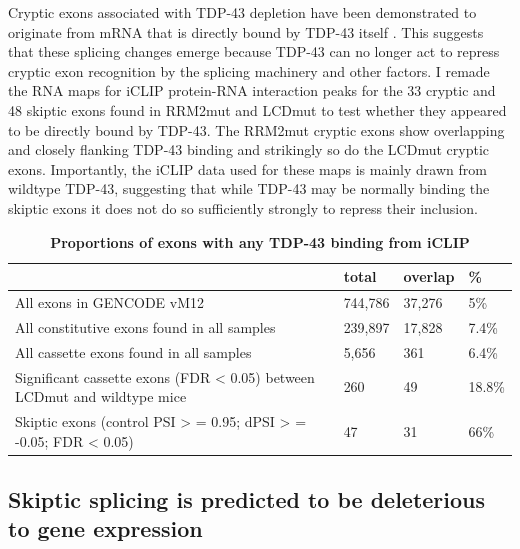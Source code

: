 Cryptic exons associated with TDP-43 depletion have been demonstrated to originate from mRNA that is directly bound by TDP-43 itself \citep{Ling2015}. 
This suggests that these splicing changes emerge because TDP-43 can no longer act to repress cryptic exon recognition by the splicing machinery and other factors. 
I remade the RNA maps for iCLIP protein-RNA interaction peaks for the 33 cryptic and 48 skiptic exons found in RRM2mut and LCDmut to test whether they appeared to be directly bound by TDP-43. 
The RRM2mut cryptic exons show overlapping and closely flanking TDP-43 binding and strikingly so do the LCDmut cryptic exons. 
Importantly, the iCLIP data used for these maps is mainly drawn from wildtype TDP-43, suggesting that while TDP-43 may be normally binding the skiptic exons it does not do so sufficiently strongly to repress their inclusion. 

\begin{table}
	\begin{footnotesize}
	\begin{tabular}{llll}
		& total &	overlap	& \% \\
		\hline
		All exons in GENCODE vM12 &	744,786	& 37,276 & 5\% \\
		All constitutive exons found in all samples	& 239,897	& 17,828	& 7.4\% \\
		All cassette exons found in all samples &	5,656 &	361	& 6.4\% \\
		Significant cassette exons (FDR < 0.05) between LCDmut and wildtype mice	& 260	& 49 & 18.8\% \\
		Skiptic exons (control PSI > = 0.95; dPSI > = -0.05; FDR < 0.05) & 47 &	31 & 66\% \\
	\end{tabular}
	\end{footnotesize}
	\caption{\textbf{Proportions of exons with any TDP-43 binding from iCLIP}}
	\label{tab:iclip_proportions}
\end{table}


\subsection{Skiptic splicing is predicted to be deleterious to gene expression}

